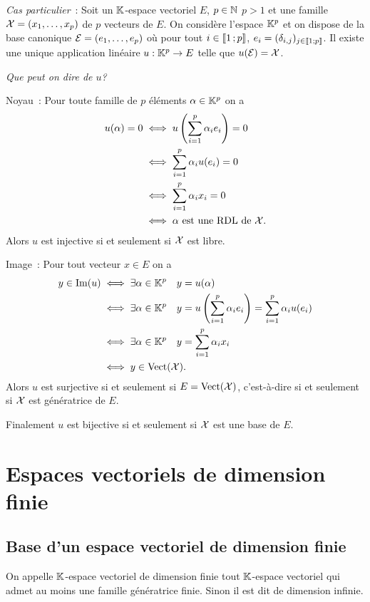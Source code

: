\emph{Cas particulier}~: Soit un \(\mathbb{K}\)-espace vectoriel \(E\), \(p \in \mathbb{N}\) \(p>1\) et une famille \(\mathcal{X}=(x_1, \ldots, x_p)\) de \(p\) vecteurs de \(E\). On considère l'espace \(\mathbb{K}^p\) et on dispose de la base canonique \(\mathcal{E}=(e_1, \ldots, e_p)\) où pour tout \(i \in \mathopen{\llbracket}1\mathclose{}\mathpunct{};p\mathclose{\rrbracket}\), \(e_i = (\delta_{i,j})_{j \in \mathopen{\llbracket}1\mathclose{}\mathpunct{};p\mathclose{\rrbracket}}\). Il existe une unique application linéaire \(u : \mathbb{K}^p \rightarrow E\) telle que \(u(\mathcal{E})=\mathcal{X}\).

\emph{Que peut on dire de \(u\)?}

Noyau~: Pour toute famille de \(p\) éléments \(\alpha \in \mathbb{K}^p\) on a
\begin{align}
  u(\alpha)=0 &\iff u\left(\sum_{i=1}^p \alpha_i e_i \right)=0\\
  &\iff \sum_{i=1}^p \alpha_i u(e_i) =0\\
  &\iff \sum_{i=1}^p \alpha_i x_i =0\\
  &\iff \alpha \text{~est une RDL de } \mathcal{X}.
\end{align}
Alors \(u\) est injective si et seulement si \(\mathcal{X}\) est libre.

Image~: Pour tout vecteur \(x \in E\) on a
\begin{align}
  y \in \operatorname{Im}(u) &\iff \exists \alpha \in \mathbb{K}^p \quad y=u(\alpha)\\
  &\iff \exists \alpha \in \mathbb{K}^p \quad y=u\left(\sum_{i=1}^p \alpha_i e_i \right)= \sum_{i=1}^p \alpha_i u(e_i) \\
  &\iff \exists \alpha \in \mathbb{K}^p \quad y=\sum_{i=1}^p \alpha_i x_i\\
  &\iff y \in \operatorname{Vect}(\mathcal{X}).
\end{align}
Alors \(u\) est surjective si et seulement si \(E=\operatorname{Vect}(\mathcal{X})\), c'est-à-dire si et seulement si \(\mathcal{X}\) est génératrice de \(E\).

Finalement \(u\) est bijective si et seulement si \(\mathcal{X}\) est une base de \(E\).

\section{Espaces vectoriels de dimension finie}

\subsection{Base d'un espace vectoriel de dimension finie}

\begin{defdef}
  On appelle \(\mathbb{K}\)-espace vectoriel de dimension finie tout \(\mathbb{K}\)-espace vectoriel qui admet au moins une famille génératrice finie. Sinon il est dit de dimension infinie.
\end{defdef}

